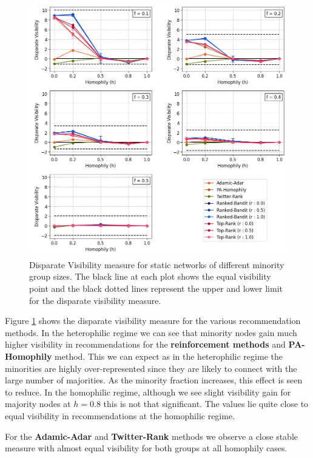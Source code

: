 \begin{figure}[h!]
	\centering
	\includegraphics[width=1.0\textwidth]{images/dv_static.png}
	\caption{Disparate Visibility measure for static networks of different minority group sizes. The black line at each plot shows the equal visibility point and the black dotted lines represent the upper and lower limit for the disparate visibility measure.}
	\label{dv_static_fig}
\end{figure}

Figure \ref{dv_static_fig} shows the disparate visibility measure for the various recommendation methods. In the heterophilic regime we can see that minority nodes gain much higher visibility in recommendations for the \textbf{reinforcement methods} and \textbf{PA-Homophily} method. This we can expect as in the heterophilic regime the minorities are highly over-represented since they are likely to connect with the large number of majorities. As the minority fraction increases, this effect is seen to reduce. In the homophilic regime, although we see slight visibility gain for majority nodes at $h=0.8$ this is not that significant. The values lie quite close to equal visibility in recommendations at the homophilic regime.

For the \textbf{Adamic-Adar} and \textbf{Twitter-Rank} methods we observe a close stable measure with almost equal visibility for both groups at all homophily cases. 

